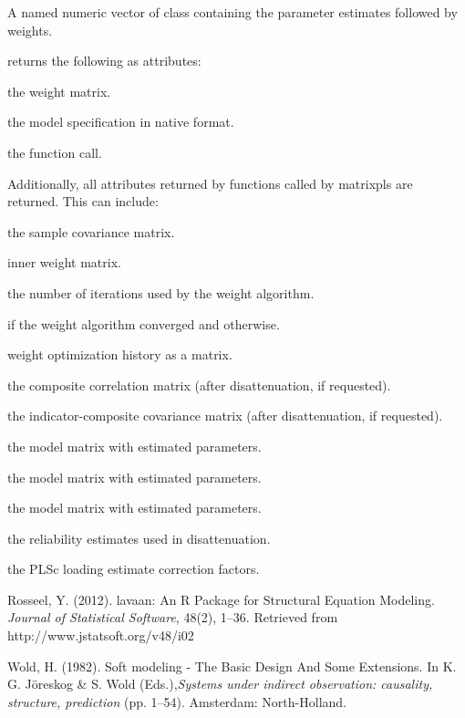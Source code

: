 \documentclass[a4paper]{book}
\begin{document}
%
\begin{Value}
A named numeric vector of class  containing the parameter estimates followed by weights.

 returns the following as attributes:

\begin{ldescription}
\item[\code{W}] the weight matrix.
\item[\code{model}] the model specification in native format.
\item[\code{call}] the function call.

\end{ldescription}
Additionally, all attributes returned by functions called by matrixpls are returned.
This can include:
\begin{ldescription}
\item[\code{S}] the sample covariance matrix.
\item[\code{E}] inner weight matrix.
\item[\code{iterations}] the number of iterations used by the weight algorithm.
\item[\code{converged}]  if the weight algorithm converged and  otherwise.
\item[\code{history}] weight optimization history as a matrix.
\item[\code{C}] the composite correlation matrix (after disattenuation, if requested).
\item[\code{IC}] the indicator-composite covariance matrix (after disattenuation, if requested).
\item[\code{inner}] the  model matrix with estimated parameters.
\item[\code{reflective}] the  model matrix with estimated parameters.
\item[\code{formative}] the  model matrix with estimated parameters.
\item[\code{Q}] the reliability estimates used in disattenuation.
\item[\code{c}] the PLSc loading estimate correction factors.
\end{ldescription}
\end{Value}
%
\begin{References}\relax
Rosseel, Y. (2012). lavaan: An R Package for Structural Equation Modeling. \emph{Journal of Statistical Software}, 48(2), 1–36. Retrieved from http://www.jstatsoft.org/v48/i02

Wold, H. (1982). Soft modeling - The Basic Design And Some Extensions. In K. G. Jöreskog \& S. Wold (Eds.),\emph{Systems under indirect observation: causality, structure, prediction} (pp. 1–54). Amsterdam: North-Holland.
\end{References}
\end{document}
